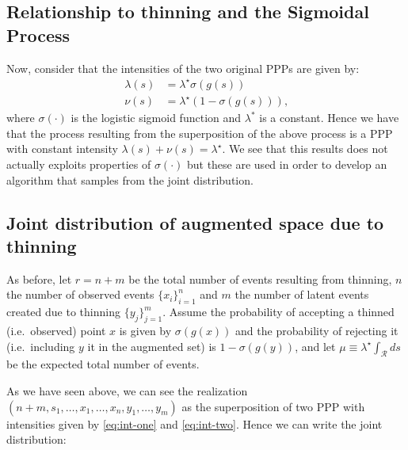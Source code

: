 \documentclass{article}
\newcommand{\calR}{\mathcal{R}}
\newcommand{\sigmoid}{\sigma}
\begin{document}
	 \subsection{Relationship to thinning and the Sigmoidal Process}
	 Now, consider that the intensities of the two original \glspl{PPP} are given by:
	 \begin{align}
	 	\label{eq:int-one}
	 	\lambda(s) &= \lambda^{\star}  \sigmoid(g(s)) \\
	 	\label{eq:int-two}
	 	\nu(s) & = \lambda^{\star} (1-\sigmoid(g(s))) \text{,}	 
	 \end{align}
	 where $\sigmoid(\cdot)$ is the logistic sigmoid function and $\lambda^{*}$ is a constant. Hence we have that the process resulting from the superposition of the above process is a \gls{PPP} with constant intensity $\lambda(s) + \nu(s) = \lambda^{\star}$. We see that this results does not actually exploits properties of $\sigmoid(\cdot)$ but these are used in order to develop an algorithm that samples from the joint distribution. 
	 
	 
	 \subsection{Joint distribution of augmented space due to thinning}
	 As before, let $r = n + m$ be  the total number of events resulting from thinning, $n$ the number of observed events $\{x_i\}_{i=1}^n$ and $m$ the number of latent events  created due to thinning $\{ y_j \}_{j=1}^{m}$. 
	  Assume the probability of accepting a thinned (i.e.~observed) point $x$ is given by $\sigmoid(g(x))$ and the probability of rejecting it (i.e.~including $y$ it in the augmented set) is $1 - \sigmoid(g(y))$, and let $\mu \equiv \lambda^{\star} \int_{\calR} ds$ be the expected total number of events. 
	 
	 As we have seen above, we can see the realization $(n+m, s_1, \ldots, x_1, \ldots, x_n, y_1, \ldots, y_m )$ as the superposition of two \gls{PPP} with intensities given by  \cref{eq:int-one} and \cref{eq:int-two}. Hence we can write the joint distribution:
	 
\end{document}
